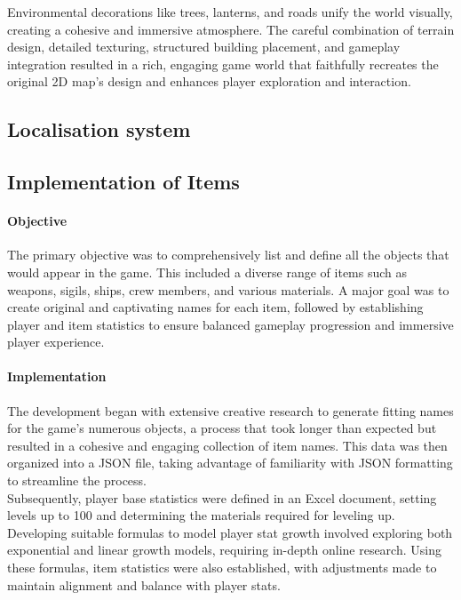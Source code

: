 \documentclass{article}
\begin{document}
Environmental decorations like trees, lanterns, and roads unify the world visually, creating a cohesive and immersive atmosphere. The careful combination of terrain design, detailed texturing, structured building placement, and gameplay integration resulted in a rich, engaging game world that faithfully recreates the original 2D map's design and enhances player exploration and interaction.










\newpage
\subsection{Localisation system}










\newpage
\subsection{Implementation of Items}
\paragraph{Objective}\hfill

The primary objective was to comprehensively list and define all the objects that would appear in the game. This included a diverse range of items such as weapons, sigils, ships, crew members, and various materials. A major goal was to create original and captivating names for each item, followed by establishing player and item statistics to ensure balanced gameplay progression and immersive player experience.

\paragraph{Implementation}\hfill

The development began with extensive creative research to generate fitting names for the game's numerous objects, a process that took longer than expected but resulted in a cohesive and engaging collection of item names. This data was then organized into a JSON file, taking advantage of familiarity with JSON formatting to streamline the process.\\

Subsequently, player base statistics were defined in an Excel document, setting levels up to 100 and determining the materials required for leveling up. Developing suitable formulas to model player stat growth involved exploring both exponential and linear growth models, requiring in-depth online research. Using these formulas, item statistics were also established, with adjustments made to maintain alignment and balance with player stats.\\
\end{document}
